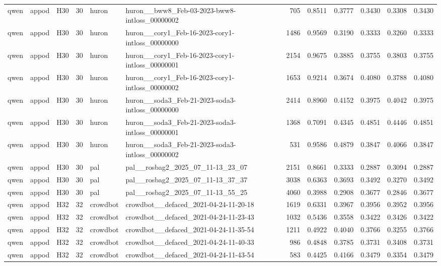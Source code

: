 \begin{table}[tbp]
\begin{tabular}{lllrllrrrrrr}
qwen & appod & H30 & 30 & huron & huron\_\_bww8\_Feb-03-2023-bww8-intloss\_00000002 & 705 & 0.8511 & 0.3777 & 0.3430 & 0.3308 & 0.3430 \\
qwen & appod & H30 & 30 & huron & huron\_\_cory1\_Feb-16-2023-cory1-intloss\_00000000 & 1486 & 0.9569 & 0.3190 & 0.3333 & 0.3260 & 0.3333 \\
qwen & appod & H30 & 30 & huron & huron\_\_cory1\_Feb-16-2023-cory1-intloss\_00000001 & 2154 & 0.9675 & 0.3885 & 0.3755 & 0.3803 & 0.3755 \\
qwen & appod & H30 & 30 & huron & huron\_\_cory1\_Feb-16-2023-cory1-intloss\_00000002 & 1653 & 0.9214 & 0.3674 & 0.4080 & 0.3788 & 0.4080 \\
qwen & appod & H30 & 30 & huron & huron\_\_soda3\_Feb-21-2023-soda3-intloss\_00000000 & 2414 & 0.8960 & 0.4152 & 0.3975 & 0.4042 & 0.3975 \\
qwen & appod & H30 & 30 & huron & huron\_\_soda3\_Feb-21-2023-soda3-intloss\_00000001 & 1368 & 0.7091 & 0.4345 & 0.4851 & 0.4446 & 0.4851 \\
qwen & appod & H30 & 30 & huron & huron\_\_soda3\_Feb-21-2023-soda3-intloss\_00000002 & 531 & 0.9586 & 0.4879 & 0.3847 & 0.4066 & 0.3847 \\
qwen & appod & H30 & 30 & pal & pal\_\_rosbag2\_2025\_07\_11-13\_23\_07 & 2151 & 0.8661 & 0.3333 & 0.2887 & 0.3094 & 0.2887 \\
qwen & appod & H30 & 30 & pal & pal\_\_rosbag2\_2025\_07\_11-13\_37\_37 & 3038 & 0.6363 & 0.3693 & 0.3492 & 0.3270 & 0.3492 \\
qwen & appod & H30 & 30 & pal & pal\_\_rosbag2\_2025\_07\_11-13\_55\_25 & 4060 & 0.3988 & 0.2908 & 0.3677 & 0.2846 & 0.3677 \\
qwen & appod & H32 & 32 & crowdbot & crowdbot\_\_defaced\_2021-04-24-11-20-18 & 1619 & 0.6331 & 0.3967 & 0.3956 & 0.3952 & 0.3956 \\
qwen & appod & H32 & 32 & crowdbot & crowdbot\_\_defaced\_2021-04-24-11-23-43 & 1032 & 0.5436 & 0.3558 & 0.3422 & 0.3426 & 0.3422 \\
qwen & appod & H32 & 32 & crowdbot & crowdbot\_\_defaced\_2021-04-24-11-35-54 & 1211 & 0.4922 & 0.4040 & 0.3766 & 0.3255 & 0.3766 \\
qwen & appod & H32 & 32 & crowdbot & crowdbot\_\_defaced\_2021-04-24-11-40-33 & 986 & 0.4848 & 0.3785 & 0.3731 & 0.3408 & 0.3731 \\
qwen & appod & H32 & 32 & crowdbot & crowdbot\_\_defaced\_2021-04-24-11-43-54 & 583 & 0.4425 & 0.4166 & 0.3479 & 0.3354 & 0.3479 \\

\end{tabular}
\end{table}
